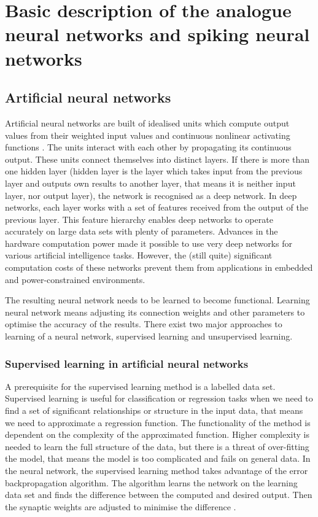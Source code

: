 \chapter{Basic description of the analogue neural networks and spiking neural networks} \label{chap:02}

\section{Artificial neural networks}
Artificial neural networks are built of idealised units which compute output values from their weighted input values and continuous nonlinear activating functions \cite{tavanaeiDeepLearningSpiking2019}. The units interact with each other by propagating its continuous output. These units connect themselves into distinct layers. If there is more than one hidden layer (hidden layer is the layer which takes input from the previous layer and outputs own results to another layer, that means it is neither input layer, nor output layer), the network is recognised as a deep network. In deep networks, each layer works with a set of features received from the output of the previous layer. This feature hierarchy enables deep networks to operate accurately on large data sets with plenty of parameters. Advances in the hardware computation power made it possible to use very deep networks for various artificial intelligence tasks. However, the (still quite) significant computation costs of these networks prevent them from applications in embedded and power-constrained environments. \par
The resulting neural network needs to be learned to become functional. Learning neural network means adjusting its connection weights and other parameters to optimise the accuracy of the results. There exist two major approaches to learning of a neural network, supervised learning and unsupervised learning.

\subsection{Supervised learning in artificial neural networks}
A prerequisite for the supervised learning method is a labelled data set. Supervised learning is useful for classification or regression tasks when we need to find a set of significant relationships or structure in the input data, that means we need to approximate a regression function. The functionality of the method is dependent on the complexity of the approximated function. Higher complexity is needed to learn the full structure of the data, but there is a threat of over-fitting the model, that means the model is too complicated and fails on general data. In the neural network, the supervised learning method takes advantage of the error backpropagation algorithm. The algorithm learns the network on the learning data set and finds the difference between the computed and desired output. Then the synaptic weights are adjusted to minimise the difference \cite{sathyaComparisonSupervisedUnsupervised2013}.

